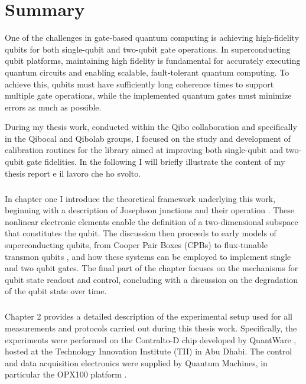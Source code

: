 \chapter*{Summary}
One of the challenges in gate-based quantum computing is achieving high-fidelity qubits for both single-qubit and two-qubit gate operations.
In superconducting qubit platforms, maintaining high fidelity is fundamental for accurately executing quantum circuits and enabling scalable, fault-tolerant quantum computing. 
To achieve this, qubits must have sufficiently long coherence times to support multiple gate operations, while the implemented quantum gates must minimize errors as much as possible.

During my thesis work, conducted within the Qibo collaboration and specifically in the Qibocal and Qibolab groups, I focused on the study and development of calibration routines for the \Qibocal library aimed at improving both single-qubit and two-qubit gate fidelities.
In the following I will briefly illustrate the content of my thesis report e il lavoro che ho svolto.

\paragraph{}
In chapter one I introduce the theoretical framework underlying this work, beginning with a description of Josephson junctions and their operation \cite{JOSEPHSON1962251}. 
These nonlinear electronic elements enable the definition of a two-dimensional subspace that constitutes the qubit. 
The discussion then proceeds to early models of superconducting qubits, from Cooper Pair Boxes (CPBs) \cite{Vion2002} to flux-tunable transmon qubits \cite{TransmonPaper}, and how these systems can be employed to implement single and two qubit gates. 
The final part of the chapter focuses on the mechanisms for qubit state readout and control, concluding with a discussion on the degradation of the qubit state over time.

\paragraph{}
Chapter 2 provides a detailed description of the experimental setup used for all measurements and protocols carried out during this thesis work. 
Specifically, the experiments were performed on the Contralto-D chip developed by QuantWare \cite{qw11q}, hosted at the Technology Innovation Institute (TII) in Abu Dhabi. 
The control and data acquisition electronics were supplied by Quantum Machines, in particular the OPX100 platform \cite{opx1000}.


